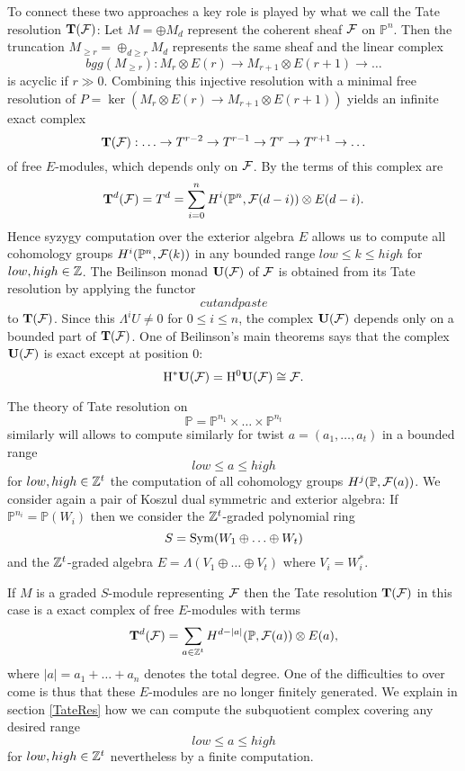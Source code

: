 \documentclass[twoside,12pt, leqno]{amsart}
\def\PP{{\mathbb P}}
\DeclareMathOperator{\rH}{{\rm H}}
\def\bT{{\bf T}}
\def\bU{{\bf U}}
\def\rH{{\rm H}}
\begin{document}
To connect these two approaches a key role is played by what we call the Tate resolution $\bf T({\mathcal F})$: Let $M=\oplus M_d$ represent the coherent sheaf ${\mathcal F}$ on $\PP^n$. Then the truncation $M_{\ge r} = \oplus_{d \ge r}M_d$ represents the same sheaf and the linear complex
$$bgg(M_{\ge r}) : M_r\otimes E(r) \to M_{r+1}\otimes E(r+1) \to \ldots$$ 
is acyclic if $r \gg 0$. Combining this injective resolution with a minimal free resolution of $P=\ker(M_r\otimes E(r) \to M_{r+1}\otimes E(r+1))$
yields an infinite exact complex
$${\bT}(\sF):   \ldots \to T^{r-2} \to T^{r-1} \to T^r \to T^{r+1} \to \ldots$$
of free $E$-modules, which depends only on ${\mathcal F}$. By \cite[Theorem x.y] {EFS} the terms of this complex are
$$\bT^d(\sF) =T^d= \sum_{i=0}^n H^i(\PP^n,\sF(d-i)) \otimes E(d-i).$$
 Hence syzygy computation over the exterior algebra $E$ allows us to compute all cohomology groups $H^i(\PP^n,\sF(k))$ in any bounded range $low \le k \le high$ for $low,high \in {\mathbb Z}$.
  The Beilinson monad $\bU(\sF)$ of ${\mathcal F}$ is obtained from its Tate resolution by applying the functor
 $$
 cut and paste
 $$
 to $\bT(\sF)$. Since this $\Lambda^i U \not=0$ for $0 \le i \le n$, the complex $\bU(\sF)$ depends only on a bounded part of $\bT(\sF)$.
 One of Beilinson's main theorems says that the complex $\bU(\sF)$ is exact except at position $0$:
 $$ \rH^* \bU(\sF) = \rH^0 \bU(\sF) \cong \sF.$$
 
 \medskip

The theory of Tate resolution on 
$$
\PP = \PP^{n_1}\times \ldots \times \PP^{n_t}
$$
similarly will allows to compute similarly for twist $a = (a_1,\ldots,a_t)$ in a bounded range
$$ low \le a \le high$$
for $low,high \in {\mathbb Z}^t$ the computation of all cohomology groups
$ H^j(\PP, \sF(a))$.
We consider again a pair of Koszul dual symmetric and exterior algebra:
If $\PP^{n_i}= \PP(W_i)$ then we consider the ${\mathbb Z}^t$-graded polynomial ring 
$$
S=\operatorname{Sym}(W_1 \oplus \ldots \oplus W_t)
$$
and the ${\mathbb Z}^t$-graded algebra $E= \Lambda(V_1 \oplus \ldots \oplus V_t)$ where $V_i =W_i^*$.

If $M$ is a graded $S$-module representing ${\mathcal F}$ then the Tate resolution $\bT(\sF)$ in this case is a
exact complex of free $E$-modules with terms
$$
\bT^d(\sF)= \sum_{a \in \ZZ^t} H^{d-|a|}(\PP,\sF(a)) \otimes E(a),
$$
where $|a|=a_1+\ldots+a_n$ denotes the total degree.
One of the difficulties to over come is thus that these $E$-modules are no longer finitely generated. We explain in section \ref{TateRes}
how we can compute the subquotient complex covering any desired range
$$ low \le a \le high$$
for $low, high \in {\mathbb Z}^t$ nevertheless by a finite computation.
\end{document}
